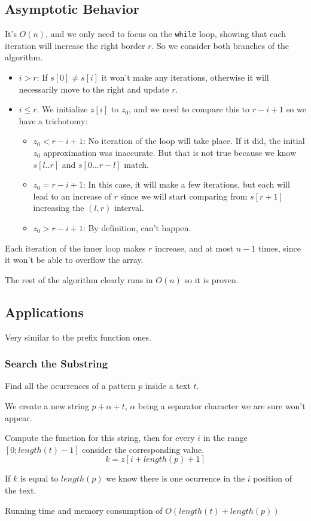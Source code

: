 \documentclass{IEEEtran}
\begin{document}
    \subsection{Asymptotic Behavior}
      It's $O(n)$, and we only need to focus on the \texttt{while} loop, showing that each iteration will increase the right border $r$. So we consider both branches of the algorithm.
      \begin{itemize}
        \item $i>r$: If $s[0] \neq s[i]$ it won't make any iterations, otherwise it will necessarily move to the right and update $r$.
        \item $i\leq r$. We initialize $z[i]$ to $z_0$, and we need to compare this to $r - i + 1$ so we have a trichotomy:
        \begin{itemize}
          \item $z_0 < r-i+1$: No iteration of the loop will take place. If it did, the initial $z_0$ approximation was inaccurate. But that is not true because we know $s[l..r]$ and $s[0...r-l]$ match.
          \item $z_0 = r-i+1$: In this case, it will make a few iterations, but each will lead to an increase of $r$ since we will start comparing from $s[r+1]$ increasing the $(l,r)$ interval.
          \item $z_0 > r-i+1$: By definition, can't happen.
        \end{itemize}
      \end{itemize}
      Each iteration of the inner loop makes $r$ increase, and at most $n-1$ times, since it won't be able to overflow the array. \par 
      The rest of the algorithm clearly runs in $O(n)$ so it is proven. 
    \subsection{Applications}
      Very similar to the prefix function ones.
      \subsubsection{Search the Substring}
        Find all the ocurrences of a pattern $p$ inside a text $t$. \par 
        We create a new string $p+\alpha+t$, $\alpha$ being a separator character we are sure won't appear. \par 
        Compute the function for this string, then for every $i$ in the range $[0;length(t)-1]$ consider the corresponding value.
        $$k = z[i+length(p)+1]$$
        \par If $k$ is equal to $length(p)$ we know there is one ocurrence in the $i$ position of the text. \par 
        Running time and memory consumption of $O(length(t)+length(p))$
\end{document}
